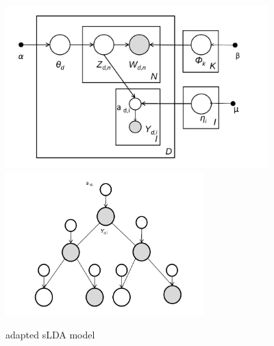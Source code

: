 \documentclass{article}
\begin{document}
\begin{figure}[h]%
   \centering
   \includegraphics[width=4in]{model_1}
   \includegraphics[width=3in]{model_2}  
   \caption{adapted sLDA model}
   \label{fig:example}
\end{figure}
\end{document}
